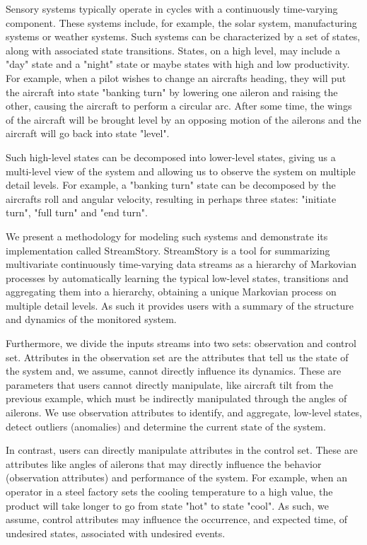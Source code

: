 Sensory systems typically operate in cycles with a continuously time-varying component. These 
systems include, for example, the solar system, manufacturing systems or weather 
systems. Such systems can be characterized by a set of states, along with associated
state transitions. States, on a high level, may include a "day" state and a "night"
state or maybe states with high and low productivity. For example, when a pilot wishes
to change an aircrafts heading, they will put the aircraft into state "banking turn"
by lowering one aileron and raising the other, causing the aircraft to perform a
circular arc. After some time, the wings of the aircraft will be brought level by
an opposing motion of the ailerons and the aircraft will go back into state "level".

Such high-level states can be decomposed into lower-level states, giving us a 
multi-level view of the system and allowing us to observe the system on multiple 
detail levels. For example, a "banking turn" state can be decomposed by the
aircrafts roll and angular velocity, resulting in perhaps three states: "initiate
turn", "full turn" and "end turn".

We present a methodology for modeling such systems and demonstrate its implementation
called StreamStory. StreamStory is a tool for summarizing multivariate continuously
time-varying data streams as a hierarchy of Markovian processes by automatically learning
the typical low-level states, transitions and aggregating them into a hierarchy, obtaining
a unique Markovian process on multiple detail levels. As such it provides users with a 
summary of the structure and dynamics of the monitored system.

Furthermore, we divide the inputs streams into two sets: observation and control set.
Attributes in the observation set are the attributes that tell us the state of the 
system and, we assume, cannot directly influence its dynamics. These are parameters
that users cannot directly manipulate, like aircraft tilt from the previous example,
which must be indirectly manipulated through the angles of ailerons. We use observation
attributes to identify, and aggregate, low-level states, detect outliers (anomalies) 
and determine the current state of the system.

In contrast, users can directly manipulate attributes in the control set. These 
are attributes like angles of ailerons that may directly influence the behavior 
(observation attributes) and performance of the system. For example, when an operator 
in a steel factory sets the cooling temperature to a high value, the product will
take longer to go from state "hot" to state "cool". As such, we assume, control attributes
may influence the occurrence, and expected time, of undesired states, associated with
undesired events.

